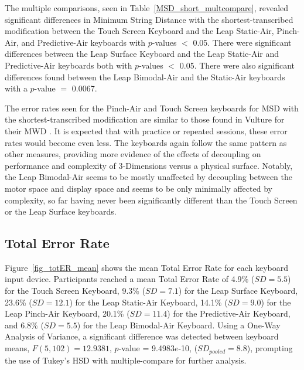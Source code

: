 The multiple comparisons, seen in Table~\ref{MSD_short_multcompare}, revealed significant differences in Minimum String Distance with the shortest-transcribed modification between the Touch Screen Keyboard and the Leap Static-Air, Pinch-Air, and Predictive-Air keyboards with $p$-values $<$ 0.05. There were significant differences between the Leap Surface Keyboard and the Leap Static-Air and Predictive-Air keyboards both with $p$-values $<$ 0.05. There were also significant differences found between the Leap Bimodal-Air and the Static-Air keyboards with a $p$-value $=$ 0.0067.

The error rates seen for the Pinch-Air and Touch Screen keyboards for MSD with the shortest-transcribed modification are similar to those found in Vulture for their MWD \cite{ref_vulture}. It is expected that with practice or repeated sessions, these error rates would become even less. The keyboards again follow the same pattern as other measures, providing more evidence of the effects of decoupling on performance and complexity of 3-Dimensions versus a physical surface. Notably, the Leap Bimodal-Air seems to be mostly unaffected by decoupling between the motor space and display space and seems to be only minimally affected by complexity, so far having never been significantly different than the Touch Screen or the Leap Surface keyboards.

\subsection{Total Error Rate}
Figure~\ref{fig_totER_mean} shows the mean Total Error Rate for each keyboard input device. Participants reached a mean Total Error Rate of 4.9\% ($SD = 5.5$) for the Touch Screen Keyboard, 9.3\% ($SD = 7.1$) for the Leap Surface Keyboard, 23.6\% ($SD = 12.1$) for the Leap Static-Air Keyboard, 14.1\% ($SD = 9.0$) for the Leap Pinch-Air Keyboard, 20.1\% ($SD = 11.4$) for the Predictive-Air Keyboard, and 6.8\% ($SD = 5.5$) for the Leap Bimodal-Air Keyboard. Using a One-Way Analysis of Variance, a significant difference was detected between keyboard means, $F(5, 102) = 12.9381$, $p$-value = 9.4983$e$-10, ($SD_{pooled} = 8.8$), prompting the use of Tukey's HSD with multiple-compare for further analysis.

